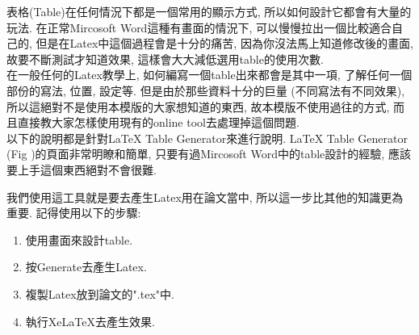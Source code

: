 
表格(Table)在任何情況下都是一個常用的顯示方式, 所以如何設計它都會有大量的玩法. 在正常Mircosoft Word這種有畫面的情況下, 可以慢慢拉出一個比較適合自己的, 但是在Latex中這個過程會是十分的痛苦, 因為你沒法馬上知道修改後的畫面, 故要不斷測試才知道效果, 這樣會大大減低選用table的使用次數.\\

在一般任何的Latex教學上, 如何編寫一個table出來都會是其中一項, 了解任何一個部份的寫法, 位置, 設定等. 但是由於那些資料十分的巨量 (不同寫法有不同效果), 所以這絕對不是使用本模版的大家想知道的東西, 故本模版不使用過往的方式, 而且直接教大家怎樣使用現有的online tool去處理掉這個問題.\\

以下的說明都是針對LaTeX Table Generator來進行說明. LaTeX Table Generator (Fig )的頁面非常明瞭和簡單, 只要有過Mircosoft Word中的table設計的經驗, 應該要上手這個東西絕對不會很難.


\newpage
{}

  我們使用這工具就是要去產生Latex用在論文當中, 所以這一步比其他的知識更為重要. 記得使用以下的步驟:

  \begin{enumerate}
  \item
  {
    使用畫面來設計table.
  } %

  \item
  {
    按Generate去產生Latex.
  } %

  \item
  {
    複製Latex放到論文的".tex"中.
  } %

  \item
  {
    執行XeLaTeX去產生效果.
  } %
  \end{enumerate}


